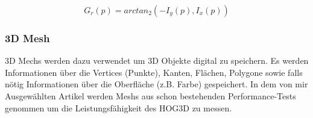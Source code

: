 \begin{equation}
\label{Grad_R}
G_r(p) = arctan_2(- I_y(p),I_x(p))
\end{equation}


\subsubsection{3D Mesh}
3D Mechs werden dazu verwendet um 3D Objekte digital zu speichern. Es werden Informationen über die Vertices (Punkte), Kanten, Flächen, Polygone sowie falls nötig Informationen über die Oberfläche (z.B. Farbe) gespeichert. In dem von mir Ausgewählten Artikel \cite{scherer2010histograms} werden Meshs aus schon bestehenden Performance-Tests genommen um die Leistungsfähigkeit des HOG3D zu messen.